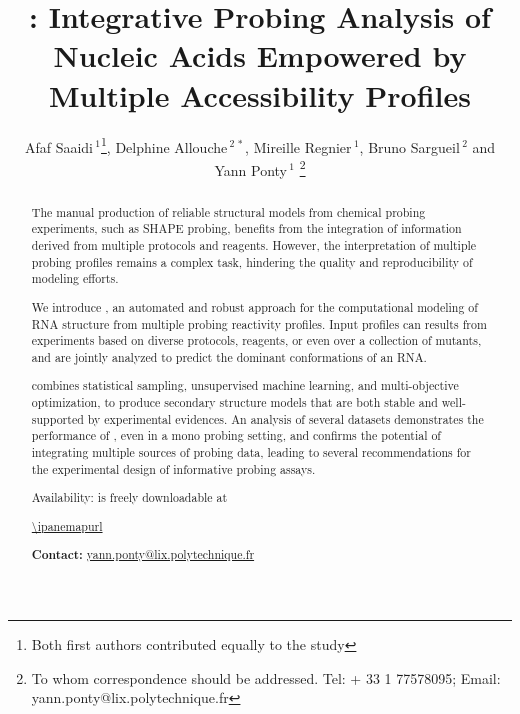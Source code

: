 \documentclass[a4,center,fleqn]{NAR}
\begin{document}
\title{\OurTool{}:  Integrative Probing Analysis of Nucleic Acids Empowered by Multiple Accessibility Profiles}
\author{%
Afaf Saaidi\,$^{1}$\footnote{Both first authors contributed equally to the study},
Delphine Allouche\,$^{2\,*}$,
Mireille Regnier\,$^{1}$,
Bruno Sargueil\,$^{2}$
and Yann Ponty\,$^1$%
\footnote{To whom correspondence should be addressed.
Tel: + 33 1 77578095; Email: yann.ponty@lix.polytechnique.fr}}


\address{%
$^{1}$\,CNRS UMR 7161, LIX, Ecole Polytechnique, France
and
$^{2}$\,CitCoM, Cibles thérapeutiques et conception de Médicaments, CNRS, University Paris Descartes, 4 avenue de l'observatoire 75006 PARIS France}


\maketitle

\begin{abstract}
The manual production of reliable structural models from chemical probing experiments, such as SHAPE probing, benefits from the integration of information derived from multiple protocols and reagents. However, the interpretation of multiple probing profiles remains a complex task, hindering the quality and reproducibility of modeling efforts.

\noindent We introduce \OurTool{}, an automated and robust approach for the computational modeling of RNA structure from multiple probing reactivity profiles. Input profiles can results from experiments based on diverse protocols, reagents, or even over a collection of mutants, and are jointly analyzed to predict the dominant conformations of an RNA.

\noindent \OurTool{} combines statistical sampling, unsupervised machine learning, and multi-objective optimization, to produce secondary structure models that are both stable and well-supported by experimental evidences. An analysis of several datasets demonstrates the performance of \OurTool, even in a mono probing setting, and confirms the potential of integrating multiple sources of probing data, leading to several recommendations for the experimental design of informative probing assays. 

\noindent Availability: \OurTool{} is freely downloadable at

{\centering \url{\ipanemapurl}\\[.5em]}

\noindent \textbf{Contact:} \href{yann.ponty@lix.polytechnique.fr}{yann.ponty@lix.polytechnique.fr}
\end{abstract}
\end{document}
